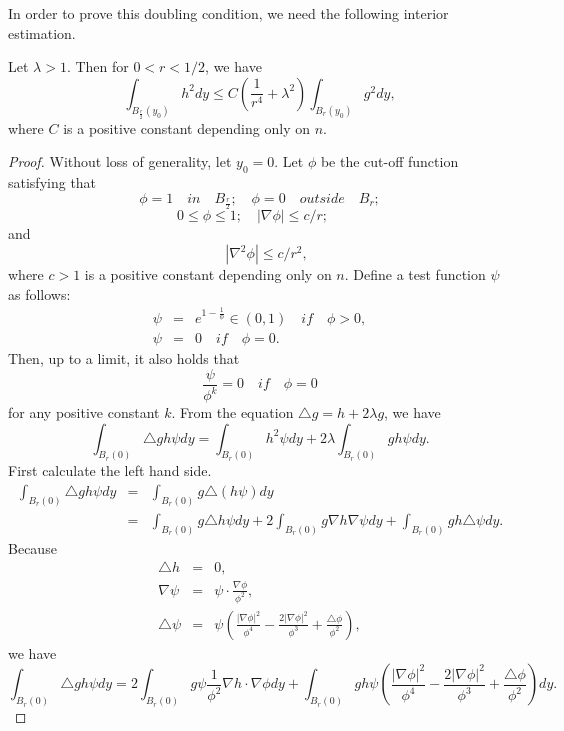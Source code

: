 \documentclass[a4paper, 12pt, onecolumn]{article} \textwidth 148mm
\begin{document}
In order to prove this doubling condition, we need the following interior estimation.
\begin{lemma}\label{h^2 controled by g^2}
Let $\lambda>1$. Then for $0<r<1/2$, we have
\begin{equation}\label{formula h^2 controled by g^2}
\int_{B_{\frac{r}{2}}(y_0)}h^2dy\leq C\left(\frac{1}{r^4}+\lambda^2\right)\int_{B_r(y_0)}g^2dy,
\end{equation}
where $C$ is a positive constant depending only on $n$.
\end{lemma}

\begin{proof}
Without loss of generality, let $y_0=0$. Let $\phi$ be the cut-off function satisfying that
$$
\phi=1\quad in \quad B_{\frac{r}{2}};\quad
\phi=0\quad outside \quad B_{r};$$$$
0\leq\phi\leq1;\quad
|\nabla\phi|\leq c/r;\quad $$
and
$$\quad
|\nabla^2\phi|\leq c/r^2,
$$
where $c>1$ is a positive constant depending only on $n$. Define a test function $\psi$ as follows:
\begin{eqnarray}\label{definition of test function}
\psi &=&e^{1-\frac{1}{\phi}}\in(0,1)\quad if\quad \phi>0,\\\nonumber
\psi &=&0 \quad if\quad\phi=0.
\end{eqnarray}
Then, up to a limit, it also holds that
\begin{equation}\label{property of test function}
\frac{\psi}{\phi^k}=0\quad if \quad \phi=0
\end{equation}
for any positive constant $k$.
From the equation $\triangle g=h+2\lambda g$, we have
\begin{equation}\label{equation times test function}
\int_{B_r(0)}\triangle gh\psi dy=\int_{B_r(0)}h^2\psi dy+2\lambda\int_{B_r(0)}gh\psi dy.
\end{equation}
First calculate the left hand side.
\begin{eqnarray*}
\int_{B_r(0)}\triangle gh\psi dy&=&\int_{B_r(0)}g\triangle(h\psi)dy
\\&=&\int_{B_r(0)}g\triangle h\psi dy+2\int_{B_r(0)}g\nabla h\nabla \psi dy
+\int_{B_r(0)}gh\triangle\psi dy.
\end{eqnarray*}
Because
\begin{eqnarray*}
\triangle h&=&0,\\
\nabla \psi&=&\psi\cdot\frac{\nabla\phi}{\phi^2},\\
\triangle \psi&=&\psi\left(\frac{|\nabla\phi|^2}{\phi^4}
-\frac{2|\nabla\phi|^2}{\phi^3}+\frac{\triangle\phi}{\phi^2}\right),
\end{eqnarray*}
we have
\begin{equation*}
\int_{B_r(0)}\triangle gh\psi dy=
2\int_{B_r(0)}g\psi\frac{1}{\phi^2}\nabla h\cdot\nabla\phi dy
+\int_{B_r(0)}gh\psi\left(\frac{|\nabla\phi|^2}{\phi^4}-\frac{2|\nabla\phi|^2}{\phi^3}
+\frac{\triangle\phi}{\phi^2}\right)dy.
\end{equation*}


\end{proof}
\end{document}

